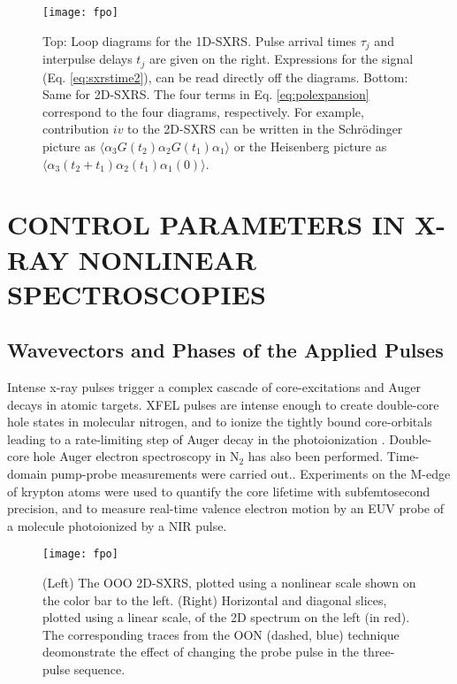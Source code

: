 \documentclass{ar-1col}
\begin{document}
\begin{figure}
\texttt{[image: fpo]}
\caption{Top: Loop diagrams for the 1D-SXRS.  Pulse arrival times $\tau_j$ and interpulse delays $t_j$ are given on the right. Expressions for the signal (Eq. \ref{eq:sxrstime2}), can be read directly off the diagrams.  Bottom: Same for 2D-SXRS.  The four terms in Eq. \ref{eq:polexpansion} correspond to the four diagrams, respectively. For example, contribution $iv$ to the 2D-SXRS can be written in the Schr\"{o}dinger picture as $\langle \alpha_3 G(t_2)\alpha_2 G(t_1)\alpha_1\rangle$ or the Heisenberg  picture as $\langle  \alpha_3(t_2+t_1)\alpha_2(t_1)\alpha_1(0)\rangle$.}\label{raman-diags}
\end{figure}

\section{CONTROL PARAMETERS IN X-RAY NONLINEAR SPECTROSCOPIES}

\subsection{Wavevectors and Phases of the Applied Pulses}

Intense x-ray pulses trigger a complex cascade of core-excitations and
Auger decays in atomic targets.\cite{young_femtosecond_2010,doumy_nonlinear_2011} XFEL pulses
are intense enough to create double-core hole states in
molecular nitrogen,\cite{fang_double_2010} and to ionize the tightly bound core-orbitals leading to a
rate-limiting step of Auger decay in the photoionization .\cite{hoener_ultraintense_2010} Double-core hole Auger
electron spectroscopy in $\textrm{N}_2$ has also been
performed.\cite{cryan_auger_2010} 
Time-domain pump-probe measurements were carried
out.\cite{glownia_time-resolved_2010}.  Experiments on the M-edge of
krypton atoms were used to quantify the core lifetime with
subfemtosecond precision,\cite{drescher_time-resolved_2002} and to
measure real-time valence electron motion by an EUV probe of a
molecule photoionized by a NIR pulse.\cite{goulielmakis_real-time_obs}

\begin{figure}
\texttt{[image: fpo]}
\caption{(Left) The OOO 2D-SXRS, plotted
  using a nonlinear scale shown on the color bar to the left.  (Right)
  Horizontal and diagonal slices, plotted using a linear scale, of the
  2D spectrum on the left (in red).
  The corresponding traces from the OON (dashed, blue) technique deomonstrate
 the effect of changing the probe pulse in the three-pulse
  sequence.}\label{fig:nma-2DRamanNNN}
\end{figure}
\end{document}
